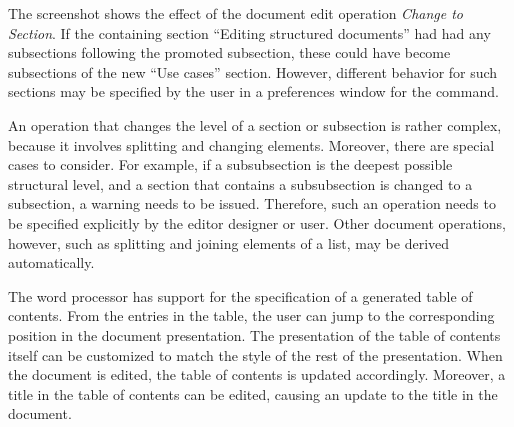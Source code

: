  
The screenshot shows the effect of the document edit operation {\em Change to Section}. If the containing section ``Editing structured documents'' had had any subsections following the promoted subsection, these could have become subsections of the new ``Use cases'' section. However, different behavior for such sections may be specified by the user in a preferences window for the command.

An operation that changes the level of a section or subsection is rather complex, because it involves splitting and changing elements. Moreover, there are special cases to consider. For example, if a subsubsection is the deepest possible structural level, and a section that contains a subsubsection is changed to a subsection, a warning needs to be issued. Therefore, such an operation needs to be specified explicitly by the editor designer or user. Other document operations, however, such as splitting and joining elements of a list, may be derived automatically.



The word processor has support for the specification of a generated table of contents. From the entries in the table, the user can jump to the corresponding position in the document presentation. The presentation of the table of contents itself can be customized to match the style of the rest of the presentation. When the document is edited, the table of contents is updated accordingly. Moreover, a title in the table of contents can be edited, causing an update to the title in the document.

